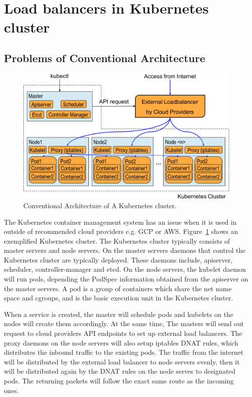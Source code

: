 \section{Load balancers in Kubernetes cluster}\label{Load balancers in Kubernetes cluster}

\subsection{Problems of Conventional Architecture}

\begin{figure}
\includegraphics[width=\columnwidth]{Figs/K8sConventional}
\caption{Conventional Architecture of A Kubernetes cluster.}
\label{fig:K8sConventional}
\end{figure}

The Kubernetes container management system has an issue when it is used in outside of recommended cloud providers e.g. GCP or AWS.
Figure~\ref{fig:K8sConventional} shows an exemplified Kubernetes cluster.
The Kubernetes cluster typically consists of master servers and node servers.
On the master servers daemons that control the Kubernetes cluster are typically deployed. 
These daemons include, apiserver, scheduler, controller-manager and etcd. 
On the node servers, the kubelet daemon will run pods, depending the PodSpec information obtained from the apiserver on the master servers.
A pod is a group of containers which share the net name space and cgroups, 
and is the basic execution unit in the Kubernetes cluster.

When a service is created, the master will schedule pods and kubelets on the nodes will create them accordingly.
At the same time, The masters will send out request to cloud providers API endpoints to set up external load balancers.
The proxy daemons on the node servers will also setup iptables DNAT\cite{MartinA.Brown2017} rules, 
which distributes the inbound traffic to the existing pods.
The traffic from the internet will be distributed by the external load balancer to node servers evenly, 
then it will be distributed again by the DNAT rules on the node serves to designated pods. 
The returning packets will follow the exact same route as the incoming ones.

